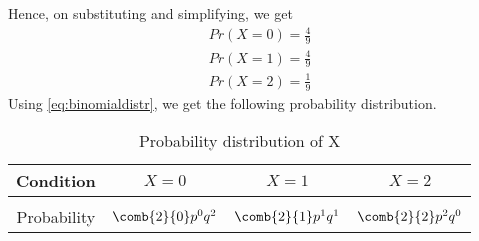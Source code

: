Hence, on substituting and simplifying, we get
\begin{align}
    \tag{5.25.6}
    Pr(X=0)=\frac{4}{9}\\
    \tag{5.25.7}
    Pr(X=1)=\frac{4}{9}\\
    \tag{5.25.8}
    Pr(X=2)=\frac{1}{9}
\end{align}
\newline
Using \eqref{eq:binomialdistr}, we get the following probability distribution.
\begin{table}[h!]
\centering
\caption{Probability distribution of X}
\label{table:1}
\begin{tabular}{|c||c|c|c|}
    \hline
    Condition & $X = 0$& $X =1 $& $X=2$ \\
    \hline
    & & &\\
    Probability & $\comb{2}{0}p^{0}q^{2}$ & $\comb{2}{1}p^{1}q^{1}$ & $\comb{2}{2}p^{2}q^{0}$\\[1ex]
    \hline
\end{tabular}
\end{table}